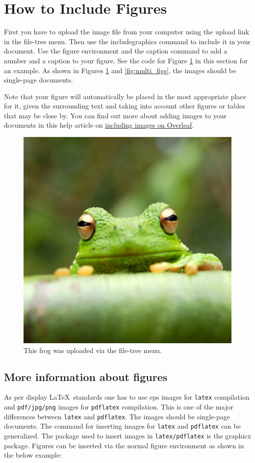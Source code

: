 \documentclass[12pt,a4paper]{article}
\begin{document}
\section{How to Include Figures}\label{sec6}

First you have to upload the image file from your computer using the upload link in the file-tree menu. Then use the includegraphics command to include it in your document. Use the figure environment and the caption command to add a number and a caption to your figure. See the code for Figure \ref{fig:frog} in this section for an example. As shown in Figures \ref{fig:frog} and \ref{fig:multi_figs}, the images should be single-page documents. 

Note that your figure will automatically be placed in the most appropriate place for it, given the surrounding text and taking into account other figures or tables that may be close by. You can find out more about adding images to your documents in this help article on \href{https://www.overleaf.com/learn/how-to/Including_images_on_Overleaf}{including images on Overleaf}.

\begin{figure}[!ht]
\centering
\includegraphics[width=0.4\linewidth]{figures/frog.jpg}
\caption{\label{fig:frog}This frog was uploaded via the file-tree menu.}
\end{figure}

\subsection{More information about figures}

As per display \LaTeX\ standards one has to use eps images for \verb+latex+ compilation and \verb+pdf/jpg/png+ images for
\verb+pdflatex+ compilation. This is one of the major differences between \verb+latex+
and \verb+pdflatex+. The images should be single-page documents. The command for inserting images
for \verb+latex+ and \verb+pdflatex+ can be generalized. The package used to insert images in \verb+latex/pdflatex+ is the
graphicx package. Figures can be inserted via the normal figure environment as shown in the below example:
\end{document}

